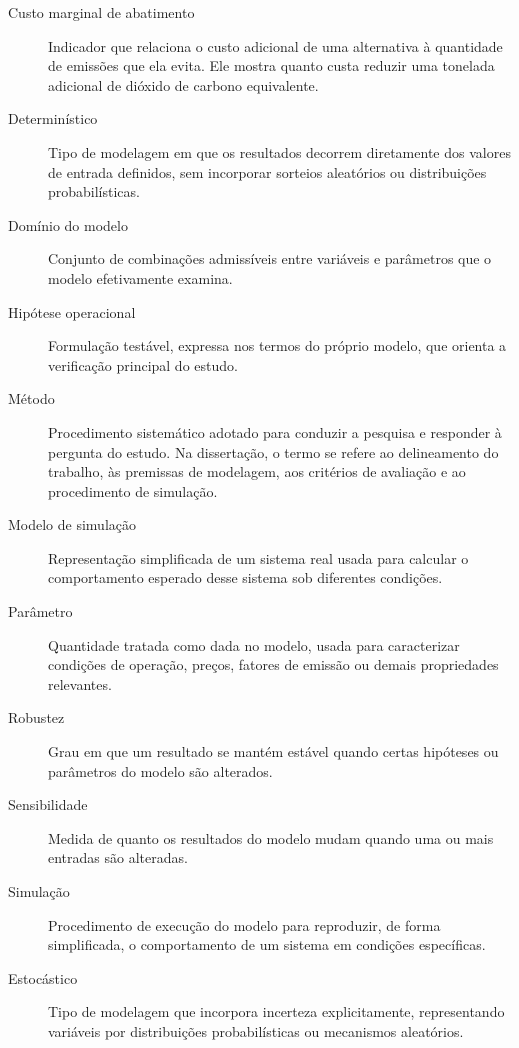 \begin{description}
    \item[Custo marginal de abatimento] Indicador que relaciona o custo adicional de uma alternativa à quantidade de emissões que ela evita. Ele mostra quanto custa reduzir uma tonelada adicional de dióxido de carbono equivalente.

    \item[Determinístico] Tipo de modelagem em que os resultados decorrem diretamente dos valores de entrada definidos, sem incorporar sorteios aleatórios ou distribuições probabilísticas.

    \item[Domínio do modelo] Conjunto de combinações admissíveis entre variáveis e parâmetros que o modelo efetivamente examina.

    \item[Hipótese operacional] Formulação testável, expressa nos termos do próprio modelo, que orienta a verificação principal do estudo.

    \item[Método] Procedimento sistemático adotado para conduzir a pesquisa e responder à pergunta do estudo. Na dissertação, o termo se refere ao delineamento do trabalho, às premissas de modelagem, aos critérios de avaliação e ao procedimento de simulação.

    \item[Modelo de simulação] Representação simplificada de um sistema real usada para calcular o comportamento esperado desse sistema sob diferentes condições.

    \item[Parâmetro] Quantidade tratada como dada no modelo, usada para caracterizar condições de operação, preços, fatores de emissão ou demais propriedades relevantes.

    \item[Robustez] Grau em que um resultado se mantém estável quando certas hipóteses ou parâmetros do modelo são alterados.

    \item[Sensibilidade] Medida de quanto os resultados do modelo mudam quando uma ou mais entradas são alteradas.

    \item[Simulação] Procedimento de execução do modelo para reproduzir, de forma simplificada, o comportamento de um sistema em condições específicas.

    \item[Estocástico] Tipo de modelagem que incorpora incerteza explicitamente, representando variáveis por distribuições probabilísticas ou mecanismos aleatórios.


\end{description}
